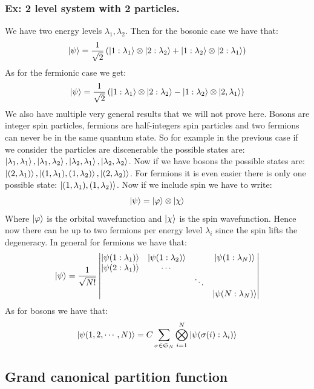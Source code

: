 \documentclass[10pt,a4paper]{book}
\begin{document}
\subsubsection{Ex: 2 level system with 2 particles.}
We have two energy levels $\lambda_1, \lambda_2$. Then for the bosonic case we have that:
\[
\ket \psi = \frac{1}{\sqrt{2}} \left(\ket{1:\lambda_1} \otimes \ket{2 : \lambda_2} + \ket{1 : \lambda_2} \otimes \ket{2 : \lambda_1}\right)
\]
As for the fermionic case we get:
\[
\ket \psi = \frac{1}{\sqrt{2}} \left( \ket{1: \lambda_1} \otimes \ket{2: \lambda_2} - \ket{1 : \lambda_2} \otimes \ket{2, \lambda_1}\right)
\]
We also have multiple very general results that we will not prove here. Bosons are integer spin particles, fermions are half-integers spin particles and two fermions can never be in the same quantum state. So for example in the previous case if we consider the particles are discenerable the possible states are: $\ket{\lambda_1, \lambda_1}, \ket{\lambda_1, \lambda_2}, \ket{\lambda_2, \lambda_1}, \ket{\lambda_2, \lambda_2}$. Now if we have bosons the possible states are: $\ket{(2, \lambda_1)}, \ket{(1, \lambda_1), (1, \lambda_2)}, \ket{(2, \lambda_2)}$. For fermions it is even easier there is only one possible state: $\ket{(1, \lambda_1), (1, \lambda_2)}$. Now if we include spin we have to write:
\[
\ket \psi = \ket \varphi \otimes \ket \chi
\]
Where $\ket \varphi$ is the orbital wavefunction and $\ket \chi$ is the spin wavefunction. Hence now there can be up to two fermions per energy level $\lambda_i$ since the spin lifts the degeneracy. In general for fermions we have that:
\[
\ket \psi = \frac{1}{\sqrt{N!}} \begin{vmatrix}
\ket{\psi(1 :\lambda_1)} & \ket{\psi(1 : \lambda_2)} & & \ket{\psi(1:\lambda_N)}\\
\ket{\psi(2 :\lambda_1)} & \cdots & & \\
 & & \ddots & \\
  & & & \ket{\psi(N:\lambda_N)} \\
\end{vmatrix}
\]
As for bosons we have that:
\[
\ket{\psi(1,2, \cdots, N)} = C \sum_{\sigma \in \mathfrak{S}_N} \bigotimes_{i = 1}^N \ket{\psi(\sigma(i) : \lambda_i)}
\]

\subsection{Grand canonical partition function}
\end{document}
